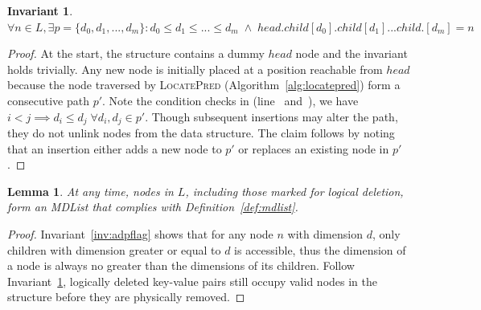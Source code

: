 \documentclass[10pt,conference,compsocconf]{IEEEtran}
\newtheorem{lemma}{Lemma}
\newtheorem{invariant}{Invariant}
\begin{document}
\begin{invariant} \label{inv:reachability}
    $\forall n \in L, \exists p=\{d_0,d_1,...,d_m\} : d_0\le d_1 \le ... \le d_m\;\land\;head.child[d_0].child[d_1]...child.[d_m]=n$
\end{invariant}
\begin{proof}
    At the start, the structure contains a dummy $head$ node and the invariant holds trivially. 
    Any new node is initially placed at a position reachable from $head$ because the node traversed by \textsc{LocatePred} (Algorithm~\ref{alg:locatepred}) form a consecutive path $p'$.
    Note the condition checks in (line~ and~), we have $i<j \implies d_i \leq d_j \;\forall d_i,d_j \in p'$.
    Though subsequent insertions may alter the path, they do not unlink nodes from the data structure.
    The claim follows by noting that an insertion either adds a new node to $p'$ or replaces an existing node in $p'$. 
\end{proof}

\begin{lemma} \label{lmm:mdlist}
    At any time, nodes in $L$, including those marked for logical deletion, form an MDList that complies with Definition~\ref{def:mdlist}.
\end{lemma}
\begin{proof}
    Invariant~\ref{inv:adpflag} shows that for any node $n$ with dimension $d$, only children with dimension greater or equal to $d$ is accessible, thus the dimension of a node is always no greater than the dimensions of its children.
    Follow Invariant~\ref{inv:reachability}, logically deleted key-value pairs still occupy valid nodes in the structure before they are physically removed.
\end{proof}

\end{document}
